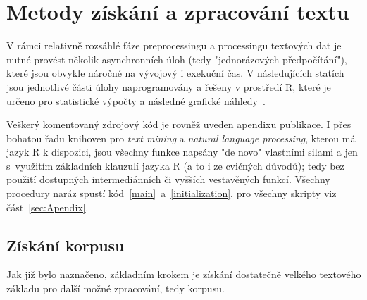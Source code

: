 
\section{Metody získání a zpracování textu}

V rámci relativně rozsáhlé fáze preprocessingu
a processingu textových dat
je nutné provést několik asynchronních úloh (tedy "jednorázových
předpočítání"), které jsou obvykle náročné na vývojový i exekuční čas.
V následujících statích jsou jednotlivé části úlohy naprogramovány a řešeny
v prostředí \textsf{R}, které je určeno pro statistické výpočty a následné
grafické náhledy~\cite{Rlanguage}.



Veškerý komentovaný zdrojový kód je rovněž uveden apendixu publikace.
I přes bohatou řadu knihoven pro \textit{text mining} a \textit{natural
language processing}, kterou má jazyk
\textsf{R} k dispozici, jsou všechny
funkce napsány "de novo" vlastními silami a jen s~využitím základních klauzulí
jazyka \textsf{R} (a to i ze cvičných důvodů); tedy bez
použití dostupných
intermediánních či vyšších vestavěných funkcí. Všechny procedury naráz spustí
kód~\ref{main}~a~\ref{initialization}, pro všechny skripty
viz část~\ref{sec:Apendix}.


\subsection{Získání korpusu}

Jak již bylo naznačeno, základním krokem je získání dostatečně velkého
textového základu pro další možné zpracování, tedy korpusu.

